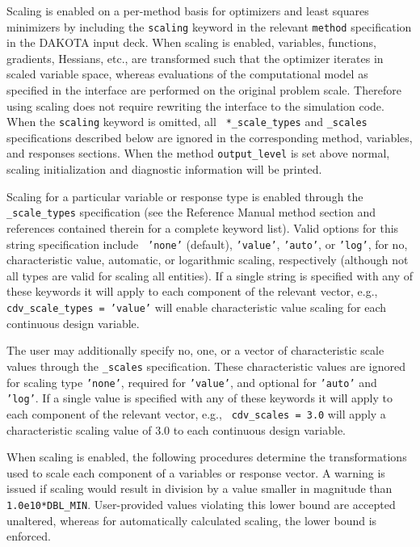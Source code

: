 Scaling is enabled on a per-method basis for optimizers and least
squares minimizers by including the {\tt scaling} keyword in the
relevant {\tt method} specification in the DAKOTA input deck.  When
scaling is enabled, variables, functions, gradients, Hessians, etc.,
are transformed such that the optimizer iterates in scaled variable
space, whereas evaluations of the computational model as specified in
the interface are performed on the original problem scale.  Therefore
using scaling does not require rewriting the interface to the
simulation code.  When the {\tt scaling} keyword is omitted, all {\tt
*\_scale\_types} and {\tt *\_scales} specifications described below
are ignored in the corresponding method, variables, and responses
sections. When the method {\tt output\_level} is set above normal,
scaling initialization and diagnostic information will be printed.

Scaling for a particular variable or response type is enabled through
the {\tt *\_scale\_types} specification (see the Reference Manual
method section and references contained therein for a complete keyword
list).  Valid options for this string specification include {\tt
'none'} (default), {\tt 'value'}, {\tt 'auto'}, or {\tt 'log'}, for
no, characteristic value, automatic, or logarithmic scaling,
respectively (although not all types are valid for scaling all
entities).  If a single string is specified with any of these keywords
it will apply to each component of the relevant vector, e.g., {\tt
cdv\_scale\_types = 'value'} will enable characteristic value scaling
for each continuous design variable.

The user may additionally specify no, one, or a vector of
characteristic scale values through the {\tt *\_scales} specification.
These characteristic values are ignored for scaling type {\tt 'none'},
required for {\tt 'value'}, and optional for {\tt 'auto'} and {\tt
'log'}. If a single value is specified with any of these keywords it
will apply to each component of the relevant vector, e.g., {\tt
cdv\_scales = 3.0} will apply a characteristic scaling value of 3.0 to
each continuous design variable.

When scaling is enabled, the following procedures determine the
transformations used to scale each component of a variables or
response vector. A warning is issued if scaling would result in
division by a value smaller in magnitude than {\tt 1.0e10*DBL\_MIN}.
User-provided values violating this lower bound are accepted
unaltered, whereas for automatically calculated scaling, the lower
bound is enforced.


